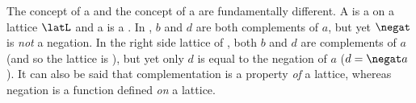 \begin{remark}
\label{rem:cmpneg}
The concept of a  and the concept of a  are fundamentally different.
A  is a  on a lattice $\latL$ and 
a  is a .
In , $b$ and $d$ are both complements of $a$, but yet $\negat$ is \emph{not} a negation.
In the right side lattice of , both $b$ and $d$ are complements of $a$
(and so the lattice is ), but yet 
only $d$ is equal to the negation of $a$ ($d=\negat a$).
It can also be said that complementation is a property \emph{of} a lattice,
whereas negation is a function defined \emph{on} a lattice.
\end{remark}

